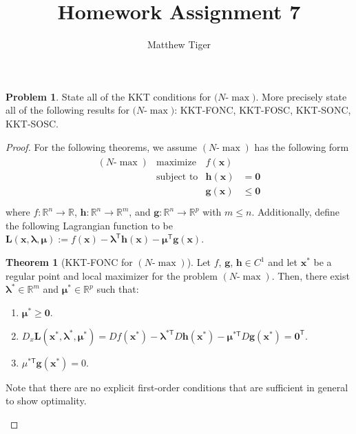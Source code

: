 \documentclass[12pt]{article}
\title{Homework Assignment 7}
\author{Matthew Tiger}
\theoremstyle{definition}
\newtheorem{problem}{Problem}
\newcommand{\vc}[1]{\boldsymbol{#1}}
\newcommand{\tran}{\mathsf{T}}
\newtheorem{theorem}{Theorem}
\begin{document}
\maketitle


\begin{problem}
  State all of the KKT conditions for $(N$-$\max)$. More precisely state all of the following
  results for $(N$-$\max)$: KKT-FONC, KKT-FOSC, KKT-SONC, KKT-SOSC.
\end{problem}

\begin{proof}
  For the following theorems, we assume $(N\text{-}\max)$ has the following form
  \begin{align*}
    \begin{array}{rrll}
      (N\text{-}\max) & \text{maximize} & f(\vc{x}) & \\
      & \text{subject to} & \vc{h}(\vc{x}) &= \vc{0} \\
      & & \vc{g}(\vc{x}) &\leq \vc{0} \\
    \end{array}
  \end{align*}
  where $f:\mathbb{R}^n\to\mathbb{R}$, $\vc{h}:\mathbb{R}^n \to \mathbb{R}^m$, and $\vc{g}:\mathbb{R}^n \to \mathbb{R}^p$ with $m \leq n$.
  Additionally, define the following Lagrangian function to be
  $\vc{L}(\vc{x}, \vc{\lambda}, \vc{\mu}) := f(\vc{x}) - \vc{\lambda}^\tran\vc{h}(\vc{x}) - \vc{\mu}^\tran\vc{g}(\vc{x})$.

  \begin{theorem}[KKT-FONC for $(N\text{-}\max)$]
    Let $f$, $\vc{g}$, $\vc{h} \in C^1$ and let
    $\vc{x}^*$ be a regular point and local maximizer for the problem $(N\text{-}\max)$. Then,
    there exist $\vc{\lambda}^*\in\mathbb{R}^m$
    and $\vc{\mu}^* \in \mathbb{R}^p$ such that:
    \begin{enumerate}[label=\roman*.]
      \item $\vc{\mu}^* \geq \vc{0}.$
      \item $D_x\vc{L}(\vc{x}^*, \vc{\lambda}^*, \vc{\mu}^*) = Df(\vc{x}^*) - \vc{\lambda}^{*\tran}D\vc{h}(\vc{x}^*) - \vc{\mu}^{*\tran}D\vc{g}(\vc{x}^*)= \vc{0}^\tran$.
      \item $\mu^{*\tran}\vc{g}(\vc{x}^*) = 0$.
    \end{enumerate}
  Note that there are no explicit first-order conditions that are sufficient
  in general to show optimality.
  \end{theorem}


\end{proof}
\end{document}
